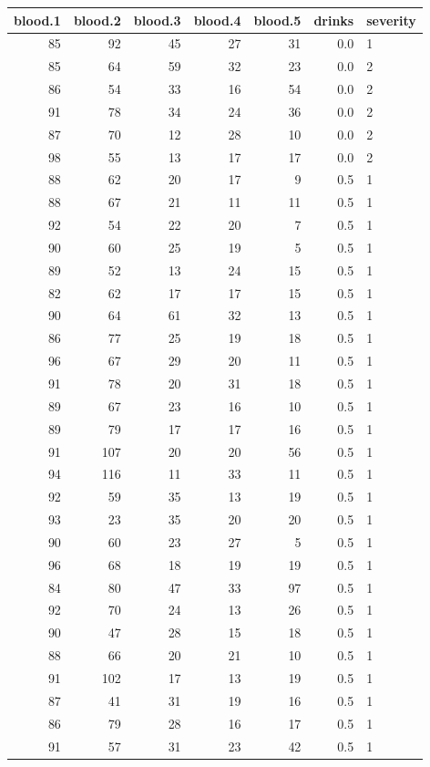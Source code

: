 \documentclass[
  11pt,
  a4paper,
]{scrartcl}
\begin{document}
\begin{longtable}[]{@{}rrrrrrl@{}}
\toprule
blood.1 & blood.2 & blood.3 & blood.4 & blood.5 & drinks & severity \\
\midrule
\endhead
85 & 92 & 45 & 27 & 31 & 0.0 & 1 \\
85 & 64 & 59 & 32 & 23 & 0.0 & 2 \\
86 & 54 & 33 & 16 & 54 & 0.0 & 2 \\
91 & 78 & 34 & 24 & 36 & 0.0 & 2 \\
87 & 70 & 12 & 28 & 10 & 0.0 & 2 \\
98 & 55 & 13 & 17 & 17 & 0.0 & 2 \\
88 & 62 & 20 & 17 & 9 & 0.5 & 1 \\
88 & 67 & 21 & 11 & 11 & 0.5 & 1 \\
92 & 54 & 22 & 20 & 7 & 0.5 & 1 \\
90 & 60 & 25 & 19 & 5 & 0.5 & 1 \\
89 & 52 & 13 & 24 & 15 & 0.5 & 1 \\
82 & 62 & 17 & 17 & 15 & 0.5 & 1 \\
90 & 64 & 61 & 32 & 13 & 0.5 & 1 \\
86 & 77 & 25 & 19 & 18 & 0.5 & 1 \\
96 & 67 & 29 & 20 & 11 & 0.5 & 1 \\
91 & 78 & 20 & 31 & 18 & 0.5 & 1 \\
89 & 67 & 23 & 16 & 10 & 0.5 & 1 \\
89 & 79 & 17 & 17 & 16 & 0.5 & 1 \\
91 & 107 & 20 & 20 & 56 & 0.5 & 1 \\
94 & 116 & 11 & 33 & 11 & 0.5 & 1 \\
92 & 59 & 35 & 13 & 19 & 0.5 & 1 \\
93 & 23 & 35 & 20 & 20 & 0.5 & 1 \\
90 & 60 & 23 & 27 & 5 & 0.5 & 1 \\
96 & 68 & 18 & 19 & 19 & 0.5 & 1 \\
84 & 80 & 47 & 33 & 97 & 0.5 & 1 \\
92 & 70 & 24 & 13 & 26 & 0.5 & 1 \\
90 & 47 & 28 & 15 & 18 & 0.5 & 1 \\
88 & 66 & 20 & 21 & 10 & 0.5 & 1 \\
91 & 102 & 17 & 13 & 19 & 0.5 & 1 \\
87 & 41 & 31 & 19 & 16 & 0.5 & 1 \\
86 & 79 & 28 & 16 & 17 & 0.5 & 1 \\
91 & 57 & 31 & 23 & 42 & 0.5 & 1 \\

\end{longtable}
\end{document}
